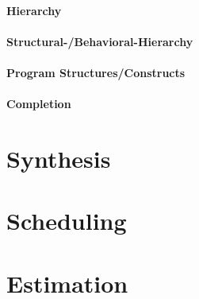 \documentclass[english]{latex4ei/latex4ei_sheet}
\begin{document}
\paragraph{Hierarchy}

\paragraph{Structural-/Behavioral-Hierarchy}

\paragraph{Program Structures/Constructs}

\paragraph{Completion}


\section{Synthesis}
\section{Scheduling}
\section{Estimation}



\end{document}
